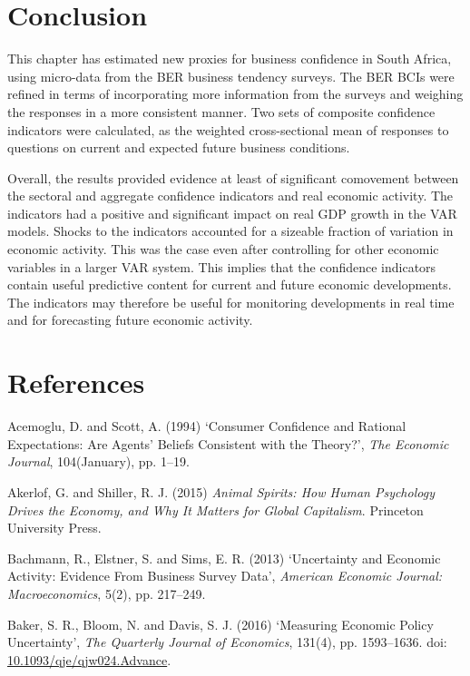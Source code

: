 \documentclass[11pt,]{article}
\begin{document}
\section{Conclusion}\label{conclusion}

This chapter has estimated new proxies for business confidence in South
Africa, using micro-data from the BER business tendency surveys. The BER
BCIs were refined in terms of incorporating more information from the
surveys and weighing the responses in a more consistent manner. Two sets
of composite confidence indicators were calculated, as the weighted
cross-sectional mean of responses to questions on current and expected
future business conditions.

Overall, the results provided evidence at least of significant
comovement between the sectoral and aggregate confidence indicators and
real economic activity. The indicators had a positive and significant
impact on real GDP growth in the VAR models. Shocks to the indicators
accounted for a sizeable fraction of variation in economic activity.
This was the case even after controlling for other economic variables in
a larger VAR system. This implies that the confidence indicators contain
useful predictive content for current and future economic developments.
The indicators may therefore be useful for monitoring developments in
real time and for forecasting future economic activity.

\section*{References}\label{references}

\hypertarget{refs}{}
\hypertarget{ref-Acemoglu1994}{}
Acemoglu, D. and Scott, A. (1994) `Consumer Confidence and Rational
Expectations: Are Agents' Beliefs Consistent with the Theory?',
\emph{The Economic Journal}, 104(January), pp. 1--19.

\hypertarget{ref-Akerlof2015}{}
Akerlof, G. and Shiller, R. J. (2015) \emph{Animal Spirits: How Human
Psychology Drives the Economy, and Why It Matters for Global
Capitalism}. Princeton University Press.

\hypertarget{ref-Bachmann2013}{}
Bachmann, R., Elstner, S. and Sims, E. R. (2013) `Uncertainty and
Economic Activity: Evidence From Business Survey Data', \emph{American
Economic Journal: Macroeconomics}, 5(2), pp. 217--249.

\hypertarget{ref-Baker2016}{}
Baker, S. R., Bloom, N. and Davis, S. J. (2016) `Measuring Economic
Policy Uncertainty', \emph{The Quarterly Journal of Economics}, 131(4),
pp. 1593--1636. doi:
\href{https://doi.org/10.1093/qje/qjw024.Advance}{10.1093/qje/qjw024.Advance}.
\end{document}
